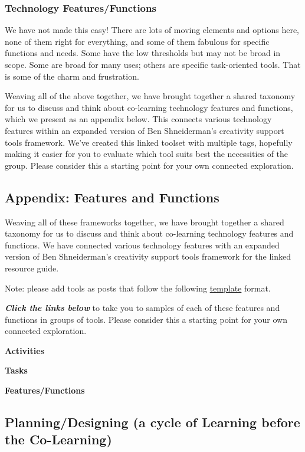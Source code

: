 \subsubsection{Technology Features/Functions}

We have not made this easy! There are lots of moving elements and
options here, none of them right for everything, and some of them
fabulous for specific functions and needs. Some have the low thresholds
but may not be broad in scope. Some are broad for many uses; others are
specific task-oriented tools. That is some of the charm and frustration.

Weaving all of the above together, we have brought together a shared
taxonomy for us to discuss and think about co-learning technology
features and functions, which we present as an appendix below. This
connects various technology features within an expanded version of Ben
Shneiderman's creativity support tools framework. We've created this
linked toolset with multiple tags, hopefully making it easier for you to
evaluate which tool suits best the necessities of the group. Please
consider this a starting point for your own connected exploration.

\subsection{Appendix: Features and Functions}

Weaving all of these frameworks together, we have brought together a
shared taxonomy for us to discuss and think about co-learning technology
features and functions. We have connected various technology features
with an expanded version of Ben Shneiderman's creativity support tools
framework for the linked resource guide.

Note: please add tools as posts that follow the following
\href{http://peeragogy.org/tool-post-template/\%20?}{template} format.

\emph{\textbf{Click the links below}} to take you to samples of each of
these features and functions in groups of tools. Please consider this a
starting point for your own connected exploration.

\textbf{Activities}

\textbf{Tasks}

\textbf{Features/Functions}

\subsection{Planning/Designing (a cycle of Learning before the
Co-Learning)}

